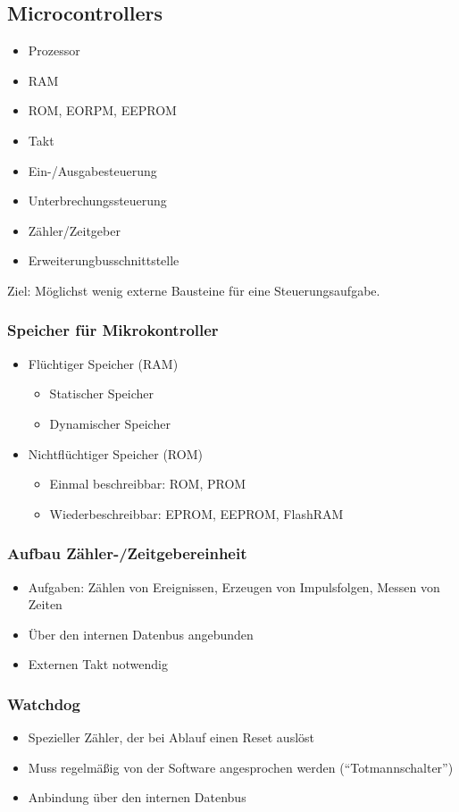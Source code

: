 \subsection{Microcontrollers}
\begin{itemize}
	\item Prozessor
	\item RAM
	\item ROM, EORPM, EEPROM
	\item Takt
	\item Ein-/Ausgabesteuerung
	\item Unterbrechungssteuerung
	\item Zähler/Zeitgeber
	\item Erweiterungbusschnittstelle
\end{itemize}
Ziel: Möglichst wenig externe Bausteine für eine Steuerungsaufgabe.

\subsubsection{Speicher für Mikrokontroller}
\begin{itemize}
	\item Flüchtiger Speicher (RAM)
	\begin{itemize}
		\item Statischer Speicher
		\item Dynamischer Speicher
	\end{itemize}
	\item Nichtflüchtiger Speicher (ROM)
	\begin{itemize}
		\item Einmal beschreibbar: ROM, PROM
		\item Wiederbeschreibbar: EPROM, EEPROM, FlashRAM
	\end{itemize}
\end{itemize}

\subsubsection{Aufbau Zähler-/Zeitgebereinheit}
\begin{itemize}
	\item Aufgaben: Zählen von Ereignissen, Erzeugen von Impulsfolgen, Messen von Zeiten
	\item Über den internen Datenbus angebunden
	\item Externen Takt notwendig
\end{itemize}

\subsubsection{Watchdog}
\begin{itemize}
	\item Spezieller Zähler, der bei Ablauf einen Reset auslöst
	\item Muss regelmäßig von der Software angesprochen werden ("`Totmannschalter"')
	\item Anbindung über den internen Datenbus
\end{itemize}


